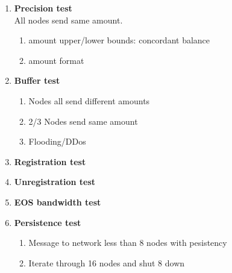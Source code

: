 \documentclass[]{article}
\begin{document}
					\begin{enumerate}
					\item \textbf{Precision test}\\
					All nodes send same amount.
						\begin{enumerate}
						\item amount upper/lower bounds: concordant balance
						\item amount format  
						\end{enumerate}
					\item \textbf{Buffer test}\\
					\begin{enumerate}
						\item Nodes all send different amounts 
						\item 2/3 Nodes send same amount
						\item Flooding/DDos  
					\end{enumerate}
						\item \textbf{Registration test}\\
						\item \textbf{Unregistration test}\\
						\item \textbf{EOS bandwidth test}\\
						\item \textbf{Persistence test}\\
							\begin{enumerate}
								\item Message to network less than 8 nodes with pesistency
								\item Iterate through 16 nodes and shut 8 down
							\end{enumerate}
				\end{enumerate}
	
\end{document}
